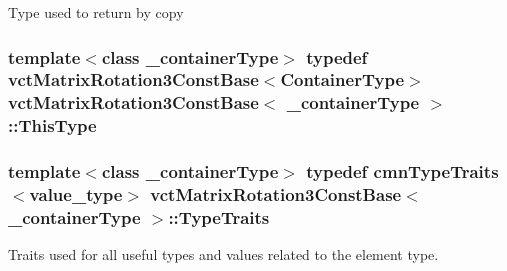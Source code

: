 Type used to return by copy \hypertarget{classvct_matrix_rotation3_const_base_ad26bf016ce37ea0532e1ce0aa7bba8a0}{
\subsubsection[{This\-Type}]{\setlength{\rightskip}{0pt plus 5cm}template$<$class \-\_\-container\-Type$>$ typedef {\bf vct\-Matrix\-Rotation3\-Const\-Base}$<${\bf Container\-Type}$>$ {\bf vct\-Matrix\-Rotation3\-Const\-Base}$<$ \-\_\-container\-Type $>$\-::{\bf This\-Type}}}\label{classvct_matrix_rotation3_const_base_ad26bf016ce37ea0532e1ce0aa7bba8a0}
\hypertarget{classvct_matrix_rotation3_const_base_af73335dedec5af83c5715335bbc8fce1}{
\subsubsection[{Type\-Traits}]{\setlength{\rightskip}{0pt plus 5cm}template$<$class \-\_\-container\-Type$>$ typedef {\bf cmn\-Type\-Traits}$<$value\-\_\-type$>$ {\bf vct\-Matrix\-Rotation3\-Const\-Base}$<$ \-\_\-container\-Type $>$\-::{\bf Type\-Traits}}}\label{classvct_matrix_rotation3_const_base_af73335dedec5af83c5715335bbc8fce1}
Traits used for all useful types and values related to the element type. 

